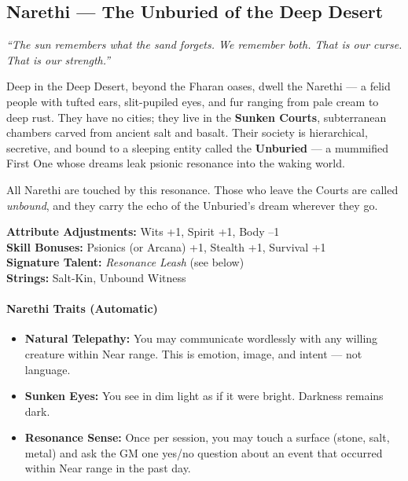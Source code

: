 \clearpage

\subsection{Narethi --- The Unburied of the Deep Desert}
\label{subsec:narethi-simplified}

\emph{``The sun remembers what the sand forgets. We remember both. That is our curse. That is our strength.''}
\vspace{0.2em}

Deep in the Deep Desert, beyond the Fharan oases, dwell the Narethi --- a felid people with tufted ears, slit-pupiled eyes, and fur ranging from pale cream to deep rust. They have no cities; they live in the \textbf{Sunken Courts}, subterranean chambers carved from ancient salt and basalt. Their society is hierarchical, secretive, and bound to a sleeping entity called the \textbf{Unburied} --- a mummified First One whose dreams leak psionic resonance into the waking world.

All Narethi are touched by this resonance. Those who leave the Courts are called \textit{unbound}, and they carry the echo of the Unburied's dream wherever they go.

\begin{tcolorbox}[colback=black!3!white,colframe=black!40!white,title=Narethi at a Glance (Player Character),breakable]
\textbf{Attribute Adjustments:} Wits +1, Spirit +1, Body --1 \\
\textbf{Skill Bonuses:} Psionics (or Arcana) +1, Stealth +1, Survival +1 \\
\textbf{Signature Talent:} \emph{Resonance Leash} (see below) \\
\textbf{Strings:} Salt-Kin, Unbound Witness
\end{tcolorbox}

\paragraph{Narethi Traits (Automatic)}
\begin{itemize}
    \item \textbf{Natural Telepathy:} You may communicate wordlessly with any willing creature within Near range. This is emotion, image, and intent --- not language.
    \item \textbf{Sunken Eyes:} You see in dim light as if it were bright. Darkness remains dark.
    \item \textbf{Resonance Sense:} Once per session, you may touch a surface (stone, salt, metal) and ask the GM one yes/no question about an event that occurred within Near range in the past day.
\end{itemize}

